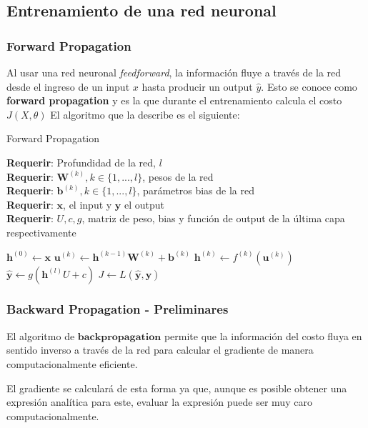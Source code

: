\subsection{Entrenamiento de una red neuronal}

\subsubsection{Forward Propagation}

Al usar una red neuronal \textit{feedforward}, la información fluye a través de la red desde el ingreso de un input $x$ hasta producir un output $\hat{y}$. Esto se conoce como \textbf{forward propagation} y es la que durante el entrenamiento calcula el costo $J(X, \theta)$ 
El algoritmo que la describe es el siguiente:

\begin{algorithm}[H] %
	\caption{Forward Propagation}
	\textbf{Requerir}: Profundidad de la red, $l$ \\
	\textbf{Requerir}: $\bm{W}^{(k)}, k \in \{1,...,l\}$, pesos de la red \\
	\textbf{Requerir}: $\bm{b}^{(k)}, k \in \{1,...,l\}$, parámetros bias de la red \\
	\textbf{Requerir}: $\bm{x}$, el input y $\bm{y}$ el output \\
	\textbf{Requerir}: $U,c,g$, matriz de peso, bias y función de output de la última capa respectivamente 
	\begin{algorithmic}[1]
		\State $\bm{h}^{(0)} \gets \bm{x}$
			\State $\bm{u}^{(k)} \gets  \bm{h}^{(k-1)}\bm{W}^{(k)} + \bm{b}^{(k)}$
			\State $\bm{h}^{(k)} \gets f^{(k)}(\bm{u}^{(k)})$
		\EndFor
		\State $\bm{\hat{y}} \gets g(\bm{h}^{(l)}U+c)$
		\State $J \gets L(\bm{\hat{y}},\bm{y})$
	\end{algorithmic}

\end{algorithm}


\subsubsection{Backward Propagation - Preliminares}

El algoritmo de $\textbf{backpropagation}$ permite que la información del costo fluya en sentido inverso a través de la red para calcular el gradiente de manera computacionalmente eficiente. 

El gradiente se calculará de esta forma ya que, aunque es posible obtener una expresión analítica para este, evaluar la expresión puede ser muy caro computacionalmente. 


